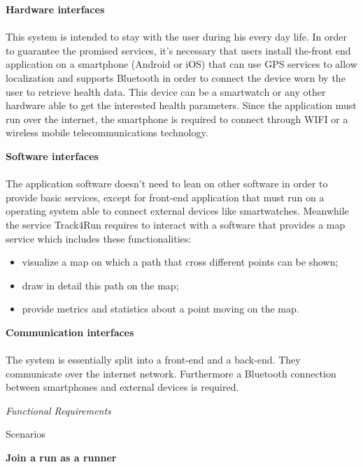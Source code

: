 \documentclass{article}
\begin{document}
\begin{legal}
\begin{legal}
\begin{legal}
			\item \textbf{Hardware interfaces}\\\\
This system is intended to stay with the user during his every day life. In order to guarantee the promised services, it’s necessary that users install the-front end application on a smartphone (Android or iOS) that can use GPS services to allow localization and supports Bluetooth in order to connect the device worn by the user to retrieve health data. This device can be a smartwatch or any other hardware able to get the interested health parameters.
Since the application must run over the internet, the smartphone is required to connect through WIFI or a wireless mobile telecommunications technology.\\
			\item \textbf{Software interfaces}\\\\
The application software doesn’t need to lean on other software in order to provide basic services, except for front-end application that must run on a operating system able to connect external devices like smartwatches. 
Meanwhile the service Track4Run requires to interact with a software that provides a map service which includes these functionalities:
				\begin{itemize}
				\item visualize a map on which a path that cross different points can be shown;
				\item draw in detail this path on the map;
				\item provide metrics and statistics about a point moving on the map.\\
				\end{itemize}
			\item \textbf{Communication interfaces}\\\\
The system is essentially split into a front-end and a back-end. They communicate over the internet network.
Furthermore a Bluetooth connection between smartphones and external devices is required.\\
			\end{legal}
		\newpage
    		\item \textit{Functional Requirements}
    		\begin{legal}
		\item Scenarios\\
		{\normalfont
		\begin{legal}
		\item \textbf{Join a run as a runner}\\


\end{legal}}
\end{legal}
\end{legal}
\end{legal}
\end{document}
